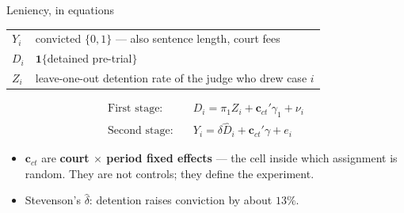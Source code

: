 \documentclass[
  11pt,
  ignorenonframetext,
  aspectratio=169,
]{beamer}
\providecommand{\tightlist}{%
  \setlength{\itemsep}{0pt}\setlength{\parskip}{0pt}}
\begin{document}
\begin{frame}{Leniency, in equations}
\protect{}\label{leniency-in-equations}
\begin{center}\small
\begin{tabular}{ll}
\toprule
$Y_i$ & convicted $\{0,1\}$ --- also sentence length, court fees \\
$D_i$ & $\mathbf{1}\{$detained pre-trial$\}$ \\
$Z_i$ & leave-one-out detention rate of the judge who drew case $i$ \\
\bottomrule
\end{tabular}
\end{center}

\vspace{-0.3em}

\begin{align*}
\text{First stage:}\quad & D_i = \pi_1 Z_i + \mathbf{c}_{ct}'\gamma_1 + \nu_i \\
\text{Second stage:}\quad & Y_i = \delta \hat D_i + \mathbf{c}_{ct}'\gamma + e_i
\end{align*}

\vspace{-0.3em}

\begin{itemize}
\tightlist
\item
  \(\mathbf{c}_{ct}\) are \textbf{court \(\times\) period fixed effects}
  --- the cell inside which assignment is random. They are not controls;
  they define the experiment.
\item
  Stevenson's \(\hat\delta\): detention raises conviction by about
  \(13\%\).
\end{itemize}
\end{frame}
\end{document}
